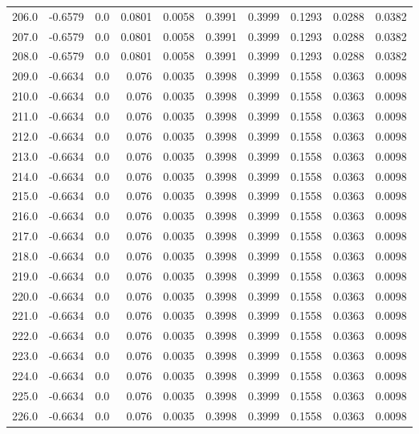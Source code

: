 \begin{longtable}{lrrrrrrrrr}
206.0 & -0.6579 & 0.0 & 0.0801 & 0.0058 & 0.3991 & 0.3999 & 0.1293 & 0.0288 & 0.0382 \\
207.0 & -0.6579 & 0.0 & 0.0801 & 0.0058 & 0.3991 & 0.3999 & 0.1293 & 0.0288 & 0.0382 \\
208.0 & -0.6579 & 0.0 & 0.0801 & 0.0058 & 0.3991 & 0.3999 & 0.1293 & 0.0288 & 0.0382 \\
209.0 & -0.6634 & 0.0 & 0.076 & 0.0035 & 0.3998 & 0.3999 & 0.1558 & 0.0363 & 0.0098 \\
210.0 & -0.6634 & 0.0 & 0.076 & 0.0035 & 0.3998 & 0.3999 & 0.1558 & 0.0363 & 0.0098 \\
211.0 & -0.6634 & 0.0 & 0.076 & 0.0035 & 0.3998 & 0.3999 & 0.1558 & 0.0363 & 0.0098 \\
212.0 & -0.6634 & 0.0 & 0.076 & 0.0035 & 0.3998 & 0.3999 & 0.1558 & 0.0363 & 0.0098 \\
213.0 & -0.6634 & 0.0 & 0.076 & 0.0035 & 0.3998 & 0.3999 & 0.1558 & 0.0363 & 0.0098 \\
214.0 & -0.6634 & 0.0 & 0.076 & 0.0035 & 0.3998 & 0.3999 & 0.1558 & 0.0363 & 0.0098 \\
215.0 & -0.6634 & 0.0 & 0.076 & 0.0035 & 0.3998 & 0.3999 & 0.1558 & 0.0363 & 0.0098 \\
216.0 & -0.6634 & 0.0 & 0.076 & 0.0035 & 0.3998 & 0.3999 & 0.1558 & 0.0363 & 0.0098 \\
217.0 & -0.6634 & 0.0 & 0.076 & 0.0035 & 0.3998 & 0.3999 & 0.1558 & 0.0363 & 0.0098 \\
218.0 & -0.6634 & 0.0 & 0.076 & 0.0035 & 0.3998 & 0.3999 & 0.1558 & 0.0363 & 0.0098 \\
219.0 & -0.6634 & 0.0 & 0.076 & 0.0035 & 0.3998 & 0.3999 & 0.1558 & 0.0363 & 0.0098 \\
220.0 & -0.6634 & 0.0 & 0.076 & 0.0035 & 0.3998 & 0.3999 & 0.1558 & 0.0363 & 0.0098 \\
221.0 & -0.6634 & 0.0 & 0.076 & 0.0035 & 0.3998 & 0.3999 & 0.1558 & 0.0363 & 0.0098 \\
222.0 & -0.6634 & 0.0 & 0.076 & 0.0035 & 0.3998 & 0.3999 & 0.1558 & 0.0363 & 0.0098 \\
223.0 & -0.6634 & 0.0 & 0.076 & 0.0035 & 0.3998 & 0.3999 & 0.1558 & 0.0363 & 0.0098 \\
224.0 & -0.6634 & 0.0 & 0.076 & 0.0035 & 0.3998 & 0.3999 & 0.1558 & 0.0363 & 0.0098 \\
225.0 & -0.6634 & 0.0 & 0.076 & 0.0035 & 0.3998 & 0.3999 & 0.1558 & 0.0363 & 0.0098 \\
226.0 & -0.6634 & 0.0 & 0.076 & 0.0035 & 0.3998 & 0.3999 & 0.1558 & 0.0363 & 0.0098 \\

\end{longtable}
